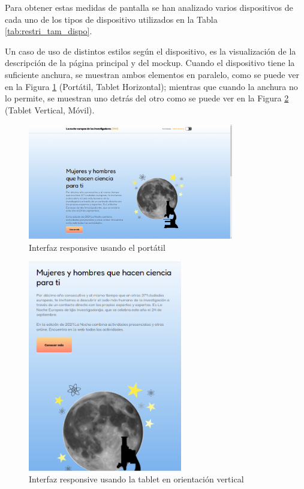 Para obtener estas medidas de pantalla se han analizado varios dispositivos de cada uno de los tipos de dispositivo utilizados en la Tabla \ref{tab:restri_tam_dispo}.

Un caso de uso de distintos estilos según el dispositivo, es la visualización de la descripción de la página principal y del \gls{mockup}. Cuando el dispositivo tiene la suficiente anchura, se muestran ambos elementos en paralelo, como se puede ver en la Figura \ref{fig:responsive_portatil} (Portátil, Tablet Horizontal); mientras que cuando la anchura no lo permite, se muestran uno detrás del otro como se puede ver en la Figura \ref{fig:responsive_tablet} (Tablet Vertical, Móvil).

\begin{figure}[h]
\centering
\includegraphics[width=0.8\textwidth]{imagenes/07_Implementacion/responsive_portatil.png}
\caption{Interfaz responsive usando el portátil}
\label{fig:responsive_portatil}
\end{figure}

\begin{figure}[h]
\centering
\includegraphics[width=0.6\textwidth]{imagenes/07_Implementacion/responsive_tablet.png}
\caption{Interfaz responsive usando la tablet en orientación vertical}
\label{fig:responsive_tablet}
\end{figure}

